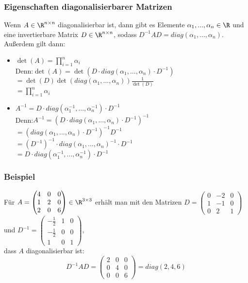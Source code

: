 \begin{frame}\frametitle{Eigenschaften diagonalisierbarer Matrizen}
Wenn $A \in \R^{n\times n}$ diagonalisierbar ist, dann gibt es Elemente $\alpha_1,...,\alpha_n \in \R$ und eine invertierbare Matrix $D \in \R^{n\times n}$, sodass $D^{-1}AD=diag(\alpha_1,...,\alpha_n)$. Außerdem gilt dann:\\\pause\vfill
\begin{itemize}
\item $\det(A)=\prod_{i=1}^n \alpha_i$\\\pause\vspace{2mm}
Denn:\quad $\det(A)=\det(D\cdot diag(\alpha_1,...,\alpha_n)\cdot D^{-1})$\\\pause
\hspace{25mm}$=\det(D)\det(diag(\alpha_1,...,\alpha_n))\frac{1}{\det(D)}$\\\pause
\hspace{25mm}$=\prod_{i=1}^n \alpha_i$\\\pause
\vfill
%
\item $A^{-1}=D\cdot diag(\alpha_1^{-1},...,\alpha_n^{-1})\cdot  D^{-1}$\\\pause\vspace{2mm}
Denn:\quad $A^{-1}=(D\cdot diag(\alpha_1,...,\alpha_n)\cdot D^{-1})^{-1}$\\\pause
\hspace{21mm}$=(diag(\alpha_1,...,\alpha_n)\cdot D^{-1})^{-1}D^{-1}$\\\pause
\hspace{21mm}$=(D^{-1})^{-1}\cdot diag(\alpha_1,...,\alpha_n)^{-1}\cdot D^{-1}$\\\pause
\hspace{21mm}$=D\cdot diag(\alpha_1^{-1},...,\alpha_n^{-1})\cdot D^{-1}$
\end{itemize} 
\end{frame}
%
%
\begin{frame}\frametitle{Beispiel}
Für $A=\begin{pmatrix}4&0&0\\1&2&0\\2&0&6 \end{pmatrix} \in \R^{3 \times 3}$  erhält man mit den Matrizen
$D=\begin{pmatrix}0&-2&0\\1&-1&0\\0&2&1 \end{pmatrix}$	
und
$D^{-1}=\begin{pmatrix}-\frac{1}{2}&1&0\\-\frac{1}{2}&0&0\\1&0&1 \end{pmatrix}$,\\\vfill
dass $A$ diagonalisierbar ist: \pause
$$
D^{-1}AD=\begin{pmatrix} 2 & 0&0 \\ 0&4&0 \\ 0&0&6 \end{pmatrix}=diag(2,4,6)
$$
\end{frame}
